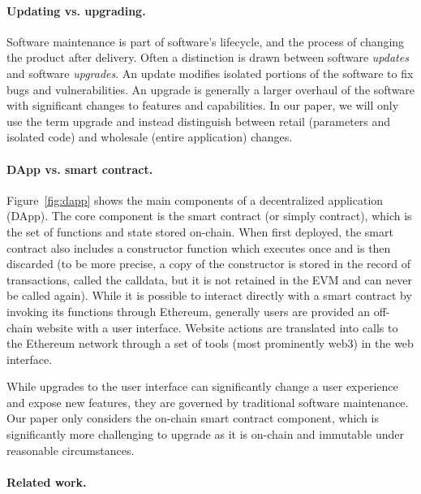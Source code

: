 \paragraph{Updating vs. upgrading.} Software maintenance is part of software's lifecycle, and the process of changing the product after delivery. Often a distinction is drawn between software \textit{updates} and software \textit{upgrades}. An update modifies isolated portions of the software to fix bugs and vulnerabilities. An upgrade is generally a larger overhaul of the software with significant changes to features and capabilities. In our paper, we will only use the term upgrade and instead distinguish between retail (parameters and isolated code) and wholesale (entire application) changes. 

\paragraph{DApp vs. smart contract.} Figure~\ref{fig:dapp} shows the main components of a decentralized application (DApp). The core component is the smart contract (or simply contract), which is the set of functions and state stored on-chain. When first deployed, the smart contract also includes a constructor function which executes once and is then discarded (to be more precise, a copy of the constructor is stored in the record of transactions, called the calldata, but it is not retained in the EVM and can never be called again). While it is possible to interact directly with a smart contract by invoking its functions through Ethereum, generally users are provided an off-chain website with a user interface. Website actions are translated into calls to the Ethereum network through a set of tools (most prominently web3) in the web interface. 

While upgrades to the user interface can significantly change a user experience and expose new features, they are governed by traditional software maintenance. Our paper only considers the on-chain smart contract component, which is significantly more challenging to upgrade as it is on-chain and immutable under reasonable circumstances. 

\paragraph{Related work.} 


